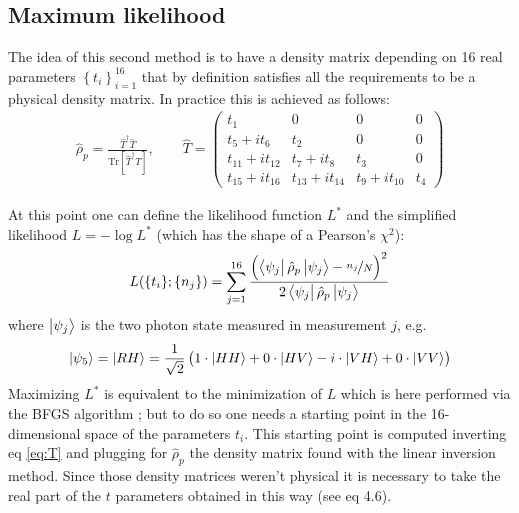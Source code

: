 \documentclass[a4paper, 11pt]{article}
\begin{document}
    \subsection{Maximum likelihood}
      The idea of this second method is to have a density matrix depending on 16 real parameters $\left\{t_i \right\}_{i=1}^{16}$ that by definition satisfies all the requirements to be a physical density matrix. In practice this is achieved as follows:
      \begin{gather} \label{eq:T}
        \hat{\rho}_p = \frac{\hat{T}^\dagger \hat{T}}{\text{Tr}[\hat{T}^\dagger \hat{T}]}, \qquad
        \hat{T} =
        \begin{pmatrix}
          t_1 & 0 & 0 & 0 \\
          t_5 + it_6 & t_2 & 0 & 0 \\
          t_{11} + it_{12} & t_7 + it_8 & t_3 & 0 \\
          t_{15} + it_{16} & t_{13} + it_{14} & t_9 + it_{10} & t_4
        \end{pmatrix}
      \end{gather}

      At this point one can define the likelihood function $L^*$ and the simplified likelihood $L = -\log{L^*}$ (which has the shape of a Pearson's $\chi^2$):
      \begin{equation*}
        L(\{t_i\}; \{n_j\}) = \sum_{j=1}^{16} \frac{\left(\bra{\psi_j}\hat{\rho}_p \ket{\psi_j} - \frac[f]{n_j}{N} \right)^2 }{2\bra{\psi_j}\hat{\rho}_p \ket{\psi_j}}
      \end{equation*}
      where $\ket{\psi_j}$ is the two photon state measured in measurement $j$, e.g.
      \begin{equation*}
        \ket{\psi_5} = \ket{RH} = \frac{1}{\sqrt{2}} \left(1\cdot\ket{HH} + 0\cdot\ket{HV} -i\cdot\ket{VH} +0\cdot\ket{VV} \right)
      \end{equation*}
      Maximizing $L^*$ is equivalent to the minimization of $L$ which is here performed via the BFGS algorithm \cite{rif:bfgs}; but to do so one needs a starting point in the 16-dimensional space of the parameters $t_i$. This starting point is computed inverting eq \ref{eq:T} and plugging for $\hat{\rho}_p$ the density matrix found with the linear inversion method. Since those density matrices weren't physical it is necessary to take the real part of the $t$ parameters obtained in this way (see \cite{rif:tomo} eq 4.6).
\end{document}
